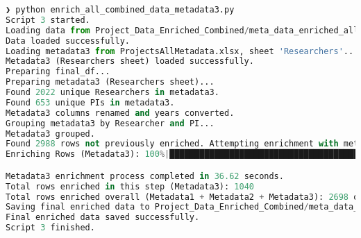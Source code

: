 \documentclass[12pt]{article}
\begin{document}
\begin{lstlisting}[language=Python]
❯ python enrich_all_combined_data_metadata3.py
Script 3 started.
Loading data from Project_Data_Enriched_Combined/meta_data_enriched_all_v2.csv...
Data loaded successfully.
Loading metadata3 from ProjectsAllMetadata.xlsx, sheet 'Researchers'...
Metadata3 (Researchers sheet) loaded successfully.
Preparing final_df...
Preparing metadata3 (Researchers sheet)...
Found 2022 unique Researchers in metadata3.
Found 653 unique PIs in metadata3.
Metadata3 columns renamed and years converted.
Grouping metadata3 by Researcher and PI...
Metadata3 grouped.
Found 2988 rows not previously enriched. Attempting enrichment with metadata3...
Enriching Rows (Metadata3): 100%|████████████████████████████████████████████████████████████████████████████████████████████████████████████████████████████████| 2988/2988 [00:36<00:00, 81.64it/s]

Metadata3 enrichment process completed in 36.62 seconds.
Total rows enriched in this step (Metadata3): 1040
Total rows enriched overall (Metadata1 + Metadata2 + Metadata3): 2698 out of 4646
Saving final enriched data to Project_Data_Enriched_Combined/meta_data_enriched_all_v3.csv...
Final enriched data saved successfully.
Script 3 finished.
\end{lstlisting}
\end{document}
